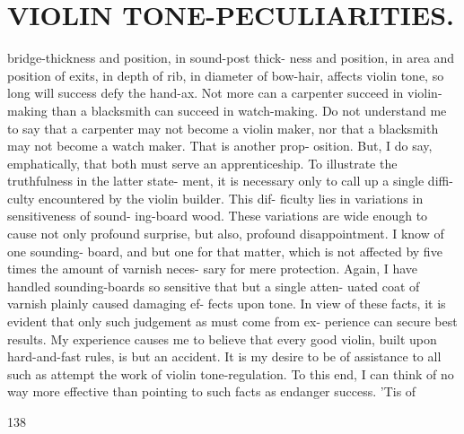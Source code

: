 \documentclass{article}
\begin{document}
\section*{VIOLIN TONE-PECULIARITIES.}
bridge-thickness and position, in sound-post thick- ness and position, in area and position of exits, in depth of rib, in diameter of bow-hair, affects violin tone, so long will success defy the hand-ax. Not more can a carpenter succeed in violin-making than a blacksmith can succeed in watch-making. Do not understand me to say that a carpenter may not become a violin maker, nor that a blacksmith may not become a watch maker. That is another prop- osition. But, I do say, emphatically, that both must serve an apprenticeship. To illustrate the truthfulness in the latter state- ment, it is necessary only to call up a single diffi- culty encountered by the violin builder. This dif- ficulty lies in variations in sensitiveness of sound- ing-board wood. These variations are wide enough to cause not only profound surprise, but also, profound disappointment. I know of one sounding- board, and but one for that matter, which is not affected by five times the amount of varnish neces- sary for mere protection. Again, I have handled sounding-boards so sensitive that but a single atten- uated coat of varnish plainly caused damaging ef- fects upon tone. In view of these facts, it is evident that only such judgement as must come from ex- perience can secure best results. My experience causes me to believe that every good violin, built upon hard-and-fast rules, is but an accident. It is my desire to be of assistance to all such as attempt the work of violin tone-regulation. To this end, I can think of no way more effective than pointing to such facts as endanger success. 'Tis of

138
\end{document}
